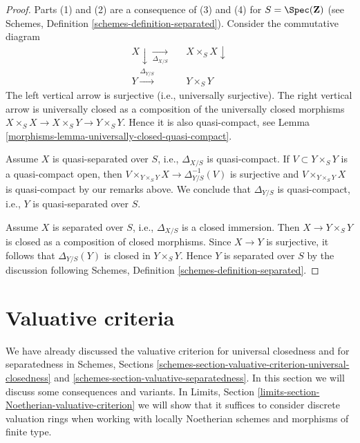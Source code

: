 \begin{proof}

Parts (1) and (2) are a consequence of (3) and (4) for
$S = \Spec(\mathbf{Z})$ (see
Schemes, Definition \ref{schemes-definition-separated}).
Consider the commutative diagram
$$
\begin{array}{ccc}X \downarrow\underset{\Delta_{X/S}}{\longrightarrow} &  & X \times_S X \downarrow \\ Y \overset{\Delta_{Y/S}}{\longrightarrow} &  & Y \times_S Y\end{array}
$$
The left vertical arrow is surjective (i.e., universally surjective).
The right vertical arrow is universally closed as a composition
of the universally closed morphisms
$X \times_S X \to X \times_S Y \to Y \times_S Y$. Hence it is also
quasi-compact, see
Lemma \ref{morphisms-lemma-universally-closed-quasi-compact}.

\medskip\noindent
Assume $X$ is quasi-separated over $S$, i.e.,  $\Delta_{X/S}$ is
quasi-compact. If $V \subset Y \times_S Y$ is a quasi-compact
open, then $V \times_{Y \times_S Y} X \to \Delta_{Y/S}^{-1}(V)$
is surjective and $V \times_{Y \times_S Y} X$ is quasi-compact by our remarks
above. We conclude that $\Delta_{Y/S}$ is quasi-compact, i.e., $Y$
is quasi-separated over $S$.

\medskip\noindent
Assume $X$ is separated over $S$, i.e., $\Delta_{X/S}$ is a closed
immersion. Then $X \to Y \times_S Y$ is closed as a
composition of closed morphisms. Since $X \to Y$ is
surjective, it follows that $\Delta_{Y/S}(Y)$ is closed in $Y \times_S Y$.
Hence $Y$ is separated over $S$ by the discussion following
Schemes, Definition \ref{schemes-definition-separated}.
\end{proof}

\section{Valuative criteria}
\label{morphisms-section-valuative-criteria}
We have already discussed the valuative criterion for universal closedness
and for separatedness in Schemes, Sections
\ref{schemes-section-valuative-criterion-universal-closedness} and
\ref{schemes-section-valuative-separatedness}.
In this section we will discuss some consequences and variants.
In Limits, Section \ref{limits-section-Noetherian-valuative-criterion}
we will show that it suffices to consider discrete valuation
rings when working with locally Noetherian schemes and
morphisms of finite type.

